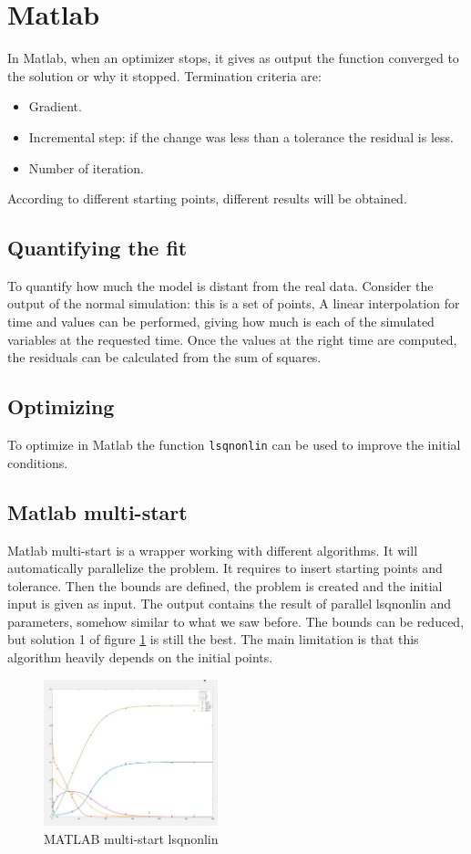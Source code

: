 \section{Matlab}
In Matlab, when an optimizer stops, it gives as output the function converged to the solution or why it stopped.
Termination criteria are:

\begin{multicols}{2}
  \begin{itemize}
    \item Gradient.
    \item Incremental step: if the change was less than a tolerance the residual is less.
    \item Number of iteration.
  \end{itemize}
\end{multicols}

According to different starting points, different results will be obtained.

  \subsection{Quantifying the fit}
  To quantify how much the model is distant from the real data.
  Consider the output of the normal simulation: this is a set of points,
  A linear interpolation for time and values can be performed, giving how much is each of the simulated variables at the requested time.
  Once the values at the right time are computed, the residuals can be calculated from the sum of squares.

  \subsection{Optimizing}
  To optimize in Matlab the function \texttt{lsqnonlin} can be used to improve the initial conditions.

  \subsection{Matlab multi-start}
  Matlab multi-start is a wrapper working with different algorithms.
  It will automatically parallelize the problem.
  It requires to insert starting points and tolerance.
  Then the bounds are defined, the problem is created and the initial input is given as input.
  The output contains the result of parallel lsqnonlin and parameters, somehow similar to what we saw before.
  The bounds can be reduced, but solution 1 of figure \ref{fig:lsqnonlin} is still the best.
  The main limitation is that this algorithm heavily depends on the initial points.

  \begin{figure}[H]
    \centering
    \includegraphics[width=0.45\textwidth]{multistep.png}
    \caption{MATLAB multi-start lsqnonlin}
    \label{fig:lsqnonlin}
  \end{figure}
